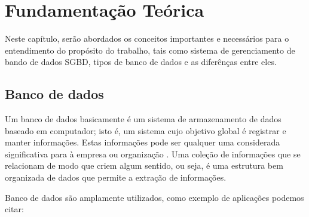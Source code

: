 \chapter{Fundamentação Teórica}
\label{cap2}

\vspace{-1.9cm}

Neste capítulo, serão abordados os conceitos importantes e necessários para o entendimento do propósito do trabalho, tais como sistema de gerenciamento de bando de dados SGBD, tipos de banco de dados e as diferênças entre eles.


\section{Banco de dados}
Um banco de dados basicamente é um sistema de armazenamento de dados baseado em computador; isto é, um sistema cujo objetivo global é registrar e manter informações. Estas informações pode ser qualquer uma considerada significativa para à empresa ou organização \cite{datebd}. Uma coleção de informações que se relacionam de modo que criem algum sentido, ou seja, é uma estrutura bem organizada de dados que permite a extração de informações. 

Banco de dados são amplamente utilizados, como exemplo de aplicações podemos citar: 


